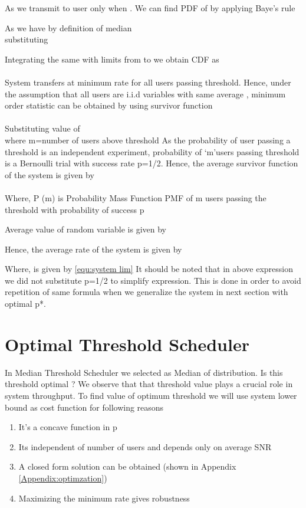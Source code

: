\documentclass[conference]{IEEEtran}
\begin{document}
	
 
As we transmit to user only when  . We can find PDF of  by applying Baye’s rule
 
 
As   we have by definition of median \\
	
 
substituting 






Integrating the same with limits from  to  we obtain CDF as\\ 
 \\
System transfers at minimum rate for all users passing threshold. Hence, under the assumption that all users are i.i.d variables with same average  , minimum order statistic can be obtained by using survivor function \\
\\ 
Substituting value of    \\
	
 
where m=number of users above threshold
As the probability of user passing a threshold is an independent experiment, probability of \textquoteleft m\textquoteright  users passing threshold is a Bernoulli trial with success rate p=1/2.
Hence, the average survivor function of the system is given by\\
  \\
Where, P (m) is Probability Mass Function PMF of m users passing the threshold with probability of success p
	
Average value of random variable is given by 

Hence, the average rate of the system is given by




Where,  is given by \ref{equ:system lim}
It should be noted that in above expression we did not substitute p=1/2 to simplify expression. This is done in order to avoid repetition of same formula when we generalize the system in next section with optimal p*.\\


\section{Optimal Threshold Scheduler }


In Median Threshold Scheduler we selected  as Median of distribution. Is this threshold optimal ? We observe that that threshold value plays a crucial role in system throughput. To find value of optimum threshold we will use system lower bound as cost function for following reasons\\
\begin{enumerate}
\item It’s a concave function in p
\item Its independent of number of users and depends only on average SNR
\item A closed form solution can be obtained (shown in Appendix \ref{Appendix:optimzation})
\item Maximizing the minimum rate gives robustness 
\end{enumerate}
\end{document}
